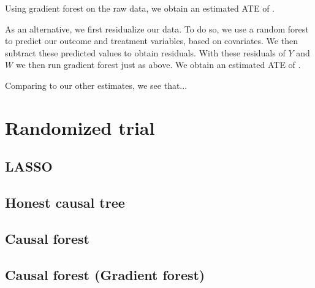 \documentclass[paper=letter, fontsize=11pt]{scrartcl} %
\begin{document}
Using gradient forest on the raw data, we obtain an estimated ATE of $ $.

As an alternative, we first residualize our data. To do so, we use a random forest to predict our outcome and treatment variables, based on covariates. We then subtract these predicted values to obtain residuals. With these residuals of $Y$ and $W$ we then run gradient forest just as above. We obtain an estimated ATE of $ $.

Comparing to our other estimates, we see that...


\section{Randomized trial}

\subsection{LASSO}

\subsection{Honest causal tree}

\subsection{Causal forest}

\subsection{Causal forest (Gradient forest)}
\end{document}
